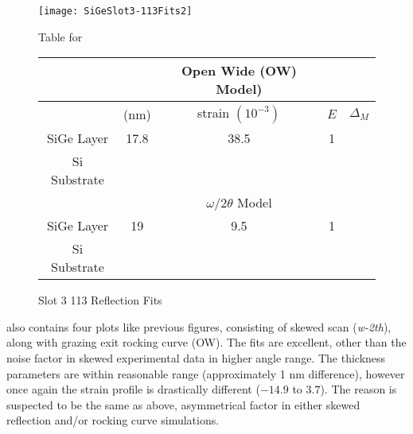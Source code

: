\begin{figure}[hc]%
\caption{Slot 3 113 Reflection Fits}
\label{Slot3-113}
\begin{minipage}{0.85\linewidth}
\texttt{[image: SiGeSlot3-113Fits2]}
\end{minipage}
\begin{minipage}{\linewidth}
\centering
\vspace{10pt}
Table for \\
\vspace{5pt}
\begin{tabular}{c|cccc}
\hline
			& 	&Open Wide (OW) Model)	 \\
\hline
			&	(nm)	&	strain	 $(10^{-3})$&	$E$ &  $\Delta_M$\\
\hline
SiGe Layer		&  	17.8	&     38.5	 & 1 & \textendash	\\
Si Substrate		&	\textemdash & \textemdash&\textemdash\ &\textemdash	\\
\hline
			& &$\omega/2\theta$ Model \\
\hline
SiGe Layer		&	19	& 9.5	&1	& \textendash\ 	\\
Si Substrate		&	\textemdash & \textemdash&\textemdash\ &\textemdash
\end{tabular}
\end{minipage}
\end{figure}

 also contains four plots like previous figures, consisting of skewed scan (\emph{w-2th}), along with grazing exit rocking curve (OW).  The fits are excellent, other than the noise factor in skewed experimental data in higher angle range.  The thickness parameters are within reasonable range (approximately 1 nm difference), however once again the strain profile is drastically different ($-14.9$ to $3.7$).  The reason is suspected to be the same as above, asymmetrical factor in either skewed reflection and/or rocking curve simulations.


